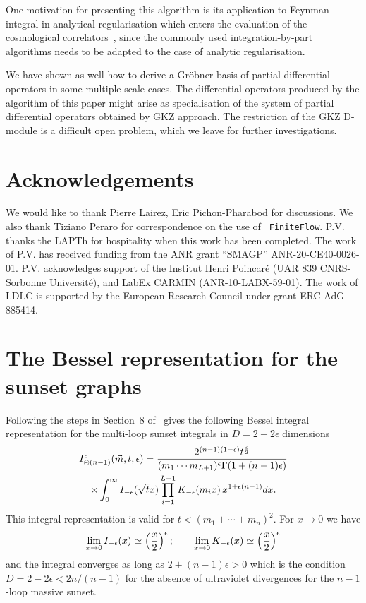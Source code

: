 \documentclass[a4paper,12pt]{article}
\numberwithin{equation}{section}
\numberwithin{figure}{section}
\def\su{\circleddash}
\begin{document}
One motivation for presenting this algorithm is its application to
Feynman integral in analytical regularisation which enters the evaluation of the cosmological
correlators~\cite{Heckelbacher:2022hbq,Chowdhury:2023khl,Chowdhury:2023arc},
since the commonly used  
integration-by-part algorithms needs to be adapted to the case of
analytic regularisation.

We have shown as well how to derive a Gr\"obner basis of partial
differential operators in some multiple scale cases. The differential
operators produced by the algorithm of this paper might arise as
specialisation of the system of partial differential operators
obtained by GKZ  approach. The restriction of the GKZ  D-module is a
difficult open problem, which we leave for further investigations.


\section*{Acknowledgements}
We would like to thank Pierre Lairez,  Eric Pichon-Pharabod  for discussions. We also thank Tiziano Peraro for correspondence on the use of {\tt
	FiniteFlow}. P.V. thanks the LAPTh for hospitality when this
      work has been completed.
The work of P.V. has received funding from the ANR grant ``SMAGP''
ANR-20-CE40-0026-01. P.V. acknowledges support of the Institut Henri
Poincar\'e (UAR 839 CNRS-Sorbonne Universit\'e), and LabEx CARMIN
(ANR-10-LABX-59-01). The work of LDLC is  supported by 
the European Research Council under grant ERC-AdG-885414. 


\appendix\section{The Bessel representation for the sunset graphs}\label{sec:bessel}


Following the steps in Section~8 of~\cite{Vanhove:2014wqa}
gives the following Bessel integral representation for the multi-loop
sunset integrals in  $D=2-2\epsilon$ dimensions
\begin{multline}
  I_{\su(n-1)}^\epsilon(\vec m,t,\epsilon)=
  {2^{(n-1) (1-\epsilon)} t^{\epsilon\over2} \over    (m_1\cdots m_{L+1})^{\epsilon}
  \Gamma(1+(n-1)\epsilon)}\cr\times\int_0^\infty I_{-\epsilon}(\sqrt{t} x)
  \prod_{i=1}^{L+1}K_{-\epsilon}(m_ix)\,  x^{1+\epsilon(n-1)}dx.
\end{multline}
This integral representation is valid for  $t<(m_1+\cdots +m_{n})^2$.
%
For $x\to0$ we have
\begin{equation}
  \lim_{x\to0} I_{-\epsilon}(x)\simeq \left(x\over2\right)^{\epsilon};    \qquad
  \lim_{x\to0} K_{-\epsilon}(x)   \simeq \left(x\over2\right)^{\epsilon}
\end{equation}
and the integral converges as long as $2+(n-1)\epsilon>0$ which is the
condition $D=2-2\epsilon< 2n/(n-1)$ for the absence of ultraviolet divergences
for the $n-1$-loop massive sunset.
\end{document}
